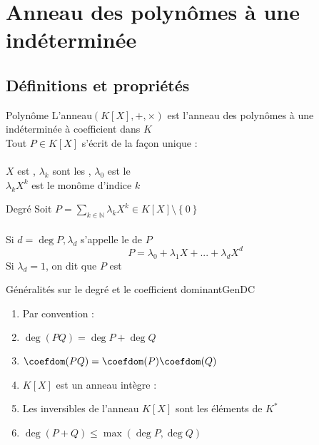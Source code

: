 \documentclass[12pt,a4paper]{report}
\begin{document}
\section{Anneau des polynômes à une indéterminée}
    \subsection{Définitions et propriétés}
    
        \begin{definition}{Polynôme}{}
        L'anneau$(K[X],+,\times)$ est l'anneau des polynômes à une indéterminée à coefficient dans $K$\\
        Tout $P\in K[X]$ s'écrit de la façon unique : \\
        \strong{\[ P= \sum_{k\in \mathbb{N}} \lambda_{k} X^{k} \]}
        \\
        $X$ est , $\lambda_{k}$ sont les , $\lambda_{0}$ est le \\
        $\lambda_{k}X^{k}$ est le monôme d'indice $k$
        \end{definition}
        
        
        \begin{definition}{Degré}{}
        Soit $P=\sum_{k\in \mathbb{N}} \lambda_{k} X^{k} \in K[X]\setminus \left\lbrace 0\right\rbrace$\\
        \\
        Si $d = \deg P, \lambda_{d}$ s'appelle le  de $P$\\
        $$P = \lambda_{0} + \lambda_{1}X + ... + \lambda_{d}X^{d} $$
        Si $\lambda_{d}=1$, on dit que $P$ est \\
        \end{definition}
     
        
        \begin{propositions}{Généralités sur le degré et le coefficient dominant}{GenDC}
        \begin{enumerate}
        \item Par convention : 
        \item $\deg(PQ)=\deg P + \deg Q$
        \item $\coefdom (PQ) = \coefdom(P) \coefdom (Q)$
        \item $K[X]$ est un anneau intègre : 
        \item Les inversibles de l'anneau $K[X]$ sont les éléments de $K^{*}$
        \item $\deg(P+Q) \leq \max(\deg P, \deg Q)$
        \end{enumerate}
        \end{propositions}
        
\end{document}
